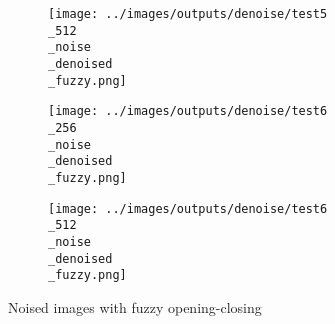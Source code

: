 \begin{figure}[!ht]
\begin{subfigure}[t]{0.15\textwidth}
    \texttt{[image: ../images/outputs/denoise/test5\\\_512\\\_noise\\\_denoised\\\_fuzzy.png]}
    \caption{}
    \centering
  \end{subfigure}
\begin{subfigure}[t]{0.15\textwidth}
    \texttt{[image: ../images/outputs/denoise/test6\\\_256\\\_noise\\\_denoised\\\_fuzzy.png]}
    \caption{}
    \centering
  \end{subfigure}
\begin{subfigure}[t]{0.15\textwidth}
    \texttt{[image: ../images/outputs/denoise/test6\\\_512\\\_noise\\\_denoised\\\_fuzzy.png]}
    \caption{}
    \centering
  \end{subfigure}
 \caption{Noised images with fuzzy opening-closing}
 \end{figure}
